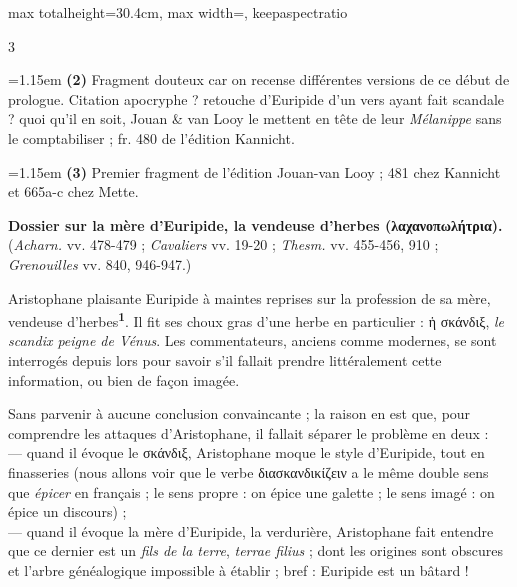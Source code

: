 \documentclass[11pt,twoside]{book}
\newcommand{\italique}[1]{\textit{#1}}
\newcommand{\latin}[1]{\textit{#1}}
\newcommand{\marqueur}[1]{\textsuperscript{\color{rubricRed}\textbf{#1}}}
\begin{document}
\begin{adjustbox}{max totalheight=30.4cm, max width=\textwidth, keepaspectratio}
\begin{minipage}{\textwidth}
{\begin{multicols}{3}
\par\vspace{1.5pt}
\noindent\hangindent=1.15em {\color{sepiaNote}\textbf{(2)}} Fragment douteux car on recense différentes versions de ce début de prologue. Citation apocryphe ? retouche d'Euripide d'un vers ayant fait scandale ? quoi qu'il en soit, Jouan \& van Looy le mettent en tête de leur \italique{Mélanippe} sans le comptabiliser ; fr. 480 de l'édition Kannicht.
\par\vspace{1.5pt}
\noindent\hangindent=1.15em {\color{sepiaNote}\textbf{(3)}} Premier fragment de l'édition Jouan-van Looy ; 481 chez Kannicht et 665a-c chez Mette.
\par\vspace{1.5pt}
 \textbf{Dossier sur la mère d'Euripide, la vendeuse d'herbes (λαχανοπωλήτρια).} (\italique{Acharn.} vv. 478-479 ; \italique{Cavaliers} vv. 19-20 ; \italique{Thesm.} vv. 455-456, 910 ; \italique{Grenouilles} vv. 840, 946-947.)
\par\vspace{1.5pt}
\noindent Aristophane plaisante Euripide à maintes reprises sur la profession de sa mère, vendeuse d'herbes\marqueur{1}. Il fit ses choux gras d'une herbe en particulier : ἡ σκάνδιξ, \italique{le scandix peigne de Vénus}. Les commentateurs, anciens comme modernes, se sont interrogés depuis lors pour savoir s'il fallait prendre littéralement cette information, ou bien de façon imagée.
\par\vspace{1.5pt}
\noindent Sans parvenir à aucune conclusion convaincante ; la raison en est que, pour comprendre les attaques d'Aristophane, il fallait séparer le problème en deux :\\ --- quand il évoque le σκάνδιξ, Aristophane moque le style d'Euripide, tout en finasseries (nous allons voir que le verbe διασκανδικίζειν a le même double sens que \italique{épicer} en français ; le sens propre : on épice une galette ; le sens imagé : on épice un discours) ;\\ --- quand il évoque la mère d'Euripide, la verdurière, Aristophane fait entendre que ce dernier est un \italique{fils de la terre}, \latin{terrae filius} ; dont les origines sont obscures et l'arbre généalogique impossible à établir ; bref : Euripide est un bâtard !
\par\vspace{1.5pt}

\end{multicols}}
\end{minipage}
\end{adjustbox}
\end{document}
